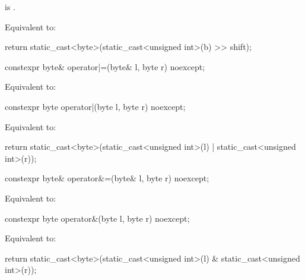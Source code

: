\begin{itemdescr}
\pnum
\constraints
{} is .

\pnum
\effects
Equivalent to:
\begin{codeblock}
return static_cast<byte>(static_cast<unsigned int>(b) >> shift);
\end{codeblock}
\end{itemdescr}

%
\begin{itemdecl}
constexpr byte& operator|=(byte& l, byte r) noexcept;
\end{itemdecl}

\begin{itemdescr}
\pnum
\effects
Equivalent to: 
\end{itemdescr}

%
\begin{itemdecl}
constexpr byte operator|(byte l, byte r) noexcept;
\end{itemdecl}

\begin{itemdescr}
\pnum
\effects
Equivalent to:
\begin{codeblock}
return static_cast<byte>(static_cast<unsigned int>(l) | static_cast<unsigned int>(r));
\end{codeblock}
\end{itemdescr}

%
\begin{itemdecl}
constexpr byte& operator&=(byte& l, byte r) noexcept;
\end{itemdecl}

\begin{itemdescr}
\pnum
\effects
Equivalent to: 
\end{itemdescr}

%
\begin{itemdecl}
constexpr byte operator&(byte l, byte r) noexcept;
\end{itemdecl}

\begin{itemdescr}
\pnum
\effects
Equivalent to:
\begin{codeblock}
return static_cast<byte>(static_cast<unsigned int>(l) & static_cast<unsigned int>(r));
\end{codeblock}
\end{itemdescr}

